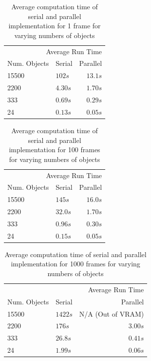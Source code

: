 \documentclass[12pt,openany,a4paper]{book}
\begin{document}
			\begin{table}[H]
				\caption{Average computation time of serial and parallel implementation for 1 frame for varying numbers of objects}
				\centering
				\begin{tabular}{llr}
					\toprule
					\multicolumn{3}{r}{Average Run Time} \\
					\cmidrule(r){2-3}
					Num. Objects & Serial & Parallel \\
					\midrule
					15500 & $102s$ & $13.1s$ \\
					2200 & $4.30s$  & $1.70s$ \\
					333 & $0.69s$ & $0.29s$ \\
					24 & $0.13s$ & $0.05s$ \\
					
					
				\end{tabular}
			\end{table}	
		
		\begin{table}[H]
			\caption{Average computation time of serial and parallel implementation for 100 frames for varying numbers of objects}
			\centering
			\begin{tabular}{llr}
				\toprule
				\multicolumn{3}{r}{Average Run Time} \\
				\cmidrule(r){2-3}
				Num. Objects & Serial & Parallel \\
				\midrule
				15500 & $145s$ & $16.0s$ \\
				2200 & $32.0s$  & $1.70s$ \\
				333 & $0.96s$ & $0.30s$ \\
				24 & $0.15s$ & $0.05s$ \\

				
			\end{tabular}
		\end{table}	
		
		\begin{table}[H]
			\caption{Average computation time of serial and parallel implementation for 1000 frames for varying numbers of objects}
			\centering
			\begin{tabular}{llr}
				\toprule
				\multicolumn{3}{r}{Average Run Time} \\
				\cmidrule(r){2-3}
				Num. Objects & Serial & Parallel \\
				\midrule
				15500 & $1422s$ &  N/A (Out of VRAM) \\
				2200 & $176s$  & $3.00s$ \\
				333 & $26.8s$ & $0.41s$ \\
				24 & $1.99s$ & $0.06s$ \\
				
				
			\end{tabular}
		\end{table}	
		
\end{document}
